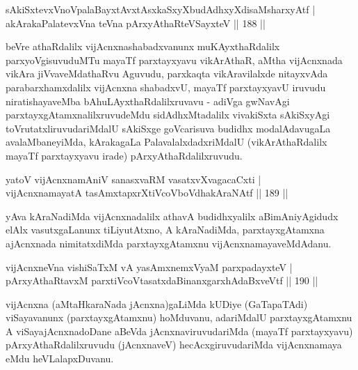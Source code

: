 \begin{shl}
sAkiSxtevxVnoVpalaBayxtAvxtAsxkaSxyXbudAdhxyXdisaMsharxyAtf |\\
akArakaPalatevxVna teVna pArxyAthaRteVSayxteV \hfill || 188 ||
\end{shl}


\begin{artha}
beVre athaRdalilx vijAcnxnashabadxvanunx muKAyxthaRdalilx parxyoVgisuvuduMTu  mayaTf parxtayxyavu vikArAthaR, aMtha vijAcnxnada vikAra jiVvaveMdathaRvu Aguvudu, parxkaqta vikAravilalxde nitayxvAda parabarxhamxdalilx vijAcnxna shabadxvU, mayaTf  parxtayxyavU iruvudu niratishayaveMba bAhuLAyxthaRdalilxruvavu - adiVga gwNavAgi parxtayxgAtamxnalilxruvudeMdu sidAdhxMtadalilx vivakiSxta sAkiSxyAgi toVrutatxliruvudariMdalU sAkiSxge goVcarisuva budidhx modalAdavugaLa avalaMbaneyiMda, kArakagaLa PalavalalxdadxriMdalU (vikArAthaRdalilx mayaTf parxtayxyavu irade) pArxyAthaRdalilxruvudu.
\end{artha}

\begin{shl}
yatoV vijAcnxnamAniV sanasxvaRM vasatxvXvagacaCxti |\\
vijAcnxnamayatA tasAmxtapxrXtiVcoV\s boVdhakAraNAtf \hfill || 189 ||
\end{shl}

\begin{artha}
yAva kAraNadiMda vijAcnxnadalilx athavA budidhxyalilx aBimAniyAgidudx elAlx vasutxgaLanunx tiLiyutAtxno, A kAraNadiMda, parxtayxgAtamxna ajAcnxnada nimitatxdiMda parxtayxgAtamxnu vijAcnxnamayaveMdAdanu.
\end{artha}


\begin{shl}
vijAcnxneVna vishiSaTxM vA yasAmxnemxVyaM parxpadayxteV |\\
pArxyAthaRtavxM parxtiVcoV\s tasatxdaBinanxgarxhAdaBxveVtf \hfill || 190 ||
\end{shl}

\begin{artha}
vijAcnxna (aMtaHkaraNada jAcnxna)gaLiMda kUDiye (GaTapaTAdi) viSayavanunx (parxtayxgAtamxnu) hoMduvanu, adariMdalU parxtayxgAtamxnu A viSayajAcnxnadoDane aBeVda jAcnxnaviruvudariMda (mayaTf parxtayxyavu) pArxyAthaRdalilxruvudu (jAcnxnaveV) hecAcxgiruvudariMda vijAcnxnamaya eMdu heVLalapxDuvanu.
\end{artha}


